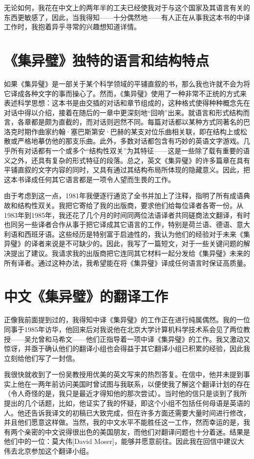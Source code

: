 无论如何，我花在中文上的两年半的工夫已经使我对于与这个国家及其语言有关的东西更敏感了，因此，当我得知——十分偶然地——有人正在从事我这本书的中译工作时，我抱着异乎寻常的兴趣想知道详情。

\section{《集异璧》独特的语言和结构特点}

如果《集异璧》是一部关于某个科学领域的平铺直叙的书，那么我也许就不会为将它译成各种文字的事而操心了。然而，《集异璧》使用了一种非常不正统的方式来表述科学思想：这本书是由交插的对话和章节组成的，这种格式使得种种概念先在对话中得以介绍，接着在随后的一章中更深刻地“回响”出来。就语言和形式结构而言，各章都是颇为直截的，而对话则迥然不同。每篇对话都以某种方式同著名的巴洛克时期作曲家约翰·塞巴斯第安·巴赫的某支对位乐曲相关联，即在结构上或松散或严格地摹仿他的那支乐曲。此外，多数对话都包含有巧妙的英语文字游戏。几乎所有对话都有一个或多个“结构性双关”为其特征——这是一些除了载有重要的语义之外，还具有复杂的形式特征的段落。总之，英文《集异璧》的许多篇章在具有平铺直叙的文字内容的同时，又具有通过其结构布局所体现的隐藏意义。因此，把这本书译成任何其它语言都是一项令人望而生畏的工作。

由于考虑到这一点，1981年我便逐行通览了全书并加上了注释，指明了所有成语典故和结构性双关。我把它寄给了我的出版商，要求他们给每位译者各寄一份。从1983年到1985年，我还花了几个月的时间同两位法语译者共同磋商法文翻译，有时也同另一些译者合作从事于把它译成其它语言的工作，特别是荷兰语、德语、意大利语和西班牙语。这些经历是特别富于启迪性的，我认为他们的经验对于未来《集异璧》的译者来说是不可缺少的。因此，我写了一篇短文，对于一些关键问题的解决提出了建议。我请求我的出版商把它连同其它材料一起分发给《集异璧》未来的所有译者。通过这种办法，我希望能在将《集异璧》译成任何语言时保证高质量。

\section{中文《集异璧》的翻译工作}

正像我前面提到过的，我得知中译《集异璧》的工作正在进行纯属偶然。我的一位同事于1985年访华，他回来后对我说他在北京大学计算机科学技术系会见了两位教授——吴允曾和马希文——他们正指导着一项中译《集异璧》的工作。我又激动又惊讶，并亟于确认他们的翻译小组也会得益于其它翻译小组已积累的经验，因此我立刻给他们写了一封信。

我很快就收到了一份吴教授用优美的英文写来的热烈答复。在信中，他并未提到事实上他在一两年前访问美国时曾试图与我联系，以便使我了解这个翻译计划的存在（令人奇怪的是，我只是最近才得知他的那次尝试）。当时他的信只是谈到了我所提出的几个话题，比如，他证实了我的怀疑，即这个小组不包括任何母语是英语的人。他还告诉我译文的初稿已大致完成，但在许多方面还需要大量时间进行修改，并且他们愿意这样做。当然，我的中文水平不能胜任这一工作，然而幸运的是，我有两个亲密的中文说得很出色的美国朋友，而他们对翻译问题也十分着迷。结果是他们中的一位：莫大伟[David Moser]，能够并愿意前往。因此我在回信中建议大伟去北京参加这个翻译小组。

